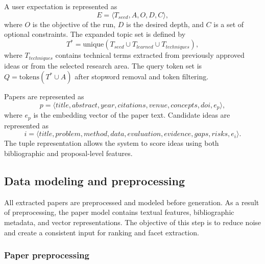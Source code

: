 \documentclass[preprint,12pt]{elsarticle}
\begin{document}
A user expectation is represented as
\begin{equation}
  E = \langle T_{seed}, A, O, D, C \rangle,
\end{equation}
where $O$ is the objective of the run, $D$ is the desired depth, and $C$ is a set of optional constraints. The expanded topic set is defined by
\begin{equation}
  T^* = \mathrm{unique}(T_{seed} \cup T_{learned} \cup T_{techniques}),
  \label{eq:topic-expansion}
\end{equation}
where $T_{techniques}$ contains technical terms extracted from previously approved ideas or from the selected research area. The query token set is $Q = \mathrm{tokens}(T^* \cup A)$ after stopword removal and token filtering.

Papers are represented as
\begin{equation}
  p = \langle title, abstract, year, citations, venue, concepts, doi, e_p \rangle,
\end{equation}
where $e_p$ is the embedding vector of the paper text. Candidate ideas are represented as
\begin{equation}
  i = \langle title, problem, method, data, evaluation, evidence, gaps, risks, e_i \rangle.
\end{equation}
The tuple representation allows the system to score ideas using both bibliographic and proposal-level features.

\subsection{Data modeling and preprocessing}

All extracted papers are preprocessed and modeled before generation. As a result of preprocessing, the paper model contains textual features, bibliographic metadata, and vector representations. The objective of this step is to reduce noise and create a consistent input for ranking and facet extraction.

\subsubsection{Paper preprocessing}
\end{document}
